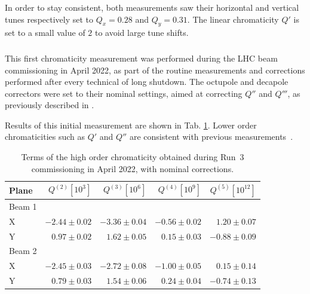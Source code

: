 In order to stay consistent, both measurements saw their horizontal and vertical tunes respectively
set to $Q_x = 0.28$ and $Q_y = 0.31$. The linear chromaticity $Q'$ is set to a small value of $2$ to
avoid large tune shifts.


\subsubsection{}

This first chromaticity measurement was performed during the LHC beam commissioning in April 2022,
as part of the routine measurements and corrections performed after every technical of long
shutdown.
The octupole and decapole correctors were set to their nominal settings, aimed at correcting $Q''$
and $Q'''$, as previously described in .

Results of this initial measurement are shown in Tab. \ref{chroma_fidel}. Lower order chromaticities such as
$Q'$ and $Q''$ are consistent with previous measurements~\cite{maclean_commissioning_2016}.

\begin{table}[!htb]
    \centering
    \begin{tabular}{lrrrr}
    \toprule
         Plane & $Q^{(2)} [10^3]$ & $Q^{(3)} [10^6]$ & $Q^{(4)} [10^9]$ & $Q^{(5)} [10^{12}]$ \\
    \midrule
        Beam 1 &              &               &              & \\
        \hspace{2mm}X         & $-2.44 \pm 0.02$ & $-3.36 \pm 0.04$ & $-0.56 \pm 0.02 $ & $ 1.20 \pm 0.07$ \\
        \hspace{2mm}Y         & $ 0.97 \pm 0.02$ & $ 1.62 \pm 0.05$ &$  0.15 \pm 0.03$ & $-0.88 \pm 0.09$ \\
        Beam 2 &              &                &                & \\
        \hspace{2mm}X         & $-2.45 \pm 0.03$ & $-2.72 \pm 0.08$ & $-1.00 \pm 0.05 $ & $ 0.15 \pm 0.14$ \\
        \hspace{2mm}Y         & $ 0.79 \pm 0.03$ & $1.54 \pm 0.06 $ & $ 0.24 \pm 0.04 $ & $-0.74 \pm 0.13$ \\
    \bottomrule
    \end{tabular}
    \caption{Terms of the high order chromaticity obtained during Run~3 commissioning in April 2022, with nominal corrections.}
    \label{chroma_fidel}
  \end{table}

